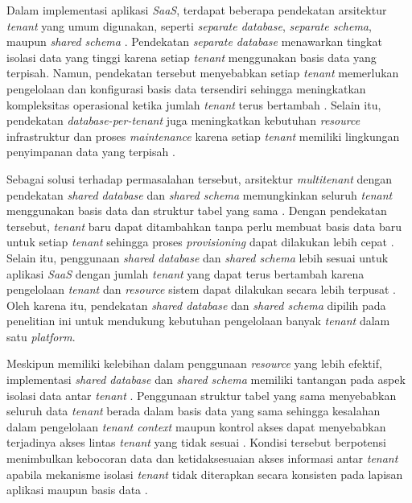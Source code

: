 Dalam implementasi aplikasi \textit{SaaS}, terdapat beberapa pendekatan arsitektur \textit{tenant}
yang umum digunakan, seperti \textit{separate database}, \textit{separate schema}, maupun
\textit{shared schema} \cite{ref6}. Pendekatan \textit{separate database} menawarkan tingkat
isolasi data yang tinggi karena setiap \textit{tenant} menggunakan basis data yang terpisah.
Namun, pendekatan tersebut menyebabkan setiap \textit{tenant} memerlukan pengelolaan dan
konfigurasi basis data tersendiri sehingga meningkatkan kompleksitas operasional ketika jumlah
\textit{tenant} terus bertambah \cite{ref7}. Selain itu, pendekatan \textit{database-per-tenant}
juga meningkatkan kebutuhan \textit{resource} infrastruktur dan proses \textit{maintenance} karena
setiap \textit{tenant} memiliki lingkungan penyimpanan data yang terpisah \cite{ref7}.

Sebagai solusi terhadap permasalahan tersebut, arsitektur \textit{multitenant} dengan pendekatan
\textit{shared database} dan \textit{shared schema} memungkinkan seluruh \textit{tenant}
menggunakan basis data dan struktur tabel yang sama \cite{ref6}. Dengan pendekatan tersebut,
\textit{tenant} baru dapat ditambahkan tanpa perlu membuat basis data baru untuk setiap
\textit{tenant} sehingga proses \textit{provisioning} dapat dilakukan lebih cepat \cite{ref8}.
Selain itu, penggunaan \textit{shared database} dan \textit{shared schema} lebih sesuai untuk
aplikasi \textit{SaaS} dengan jumlah \textit{tenant} yang dapat terus bertambah karena pengelolaan
\textit{tenant} dan \textit{resource} sistem dapat dilakukan secara lebih terpusat \cite{ref7}.
Oleh karena itu, pendekatan \textit{shared database} dan \textit{shared schema} dipilih pada
penelitian ini untuk mendukung kebutuhan pengelolaan banyak \textit{tenant} dalam satu
\textit{platform}.

Meskipun memiliki kelebihan dalam penggunaan \textit{resource} yang lebih efektif, implementasi
\textit{shared database} dan \textit{shared schema} memiliki tantangan pada aspek isolasi data
antar \textit{tenant} \cite{ref9}. Penggunaan struktur tabel yang sama menyebabkan seluruh data
\textit{tenant} berada dalam basis data yang sama sehingga kesalahan dalam pengelolaan
\textit{tenant context} maupun kontrol akses dapat menyebabkan terjadinya akses lintas
\textit{tenant} yang tidak sesuai \cite{ref6}. Kondisi tersebut berpotensi menimbulkan kebocoran
data dan ketidaksesuaian akses informasi antar \textit{tenant} apabila mekanisme isolasi
\textit{tenant} tidak diterapkan secara konsisten pada lapisan aplikasi maupun basis data
\cite{ref4} \cite{ref9}.

